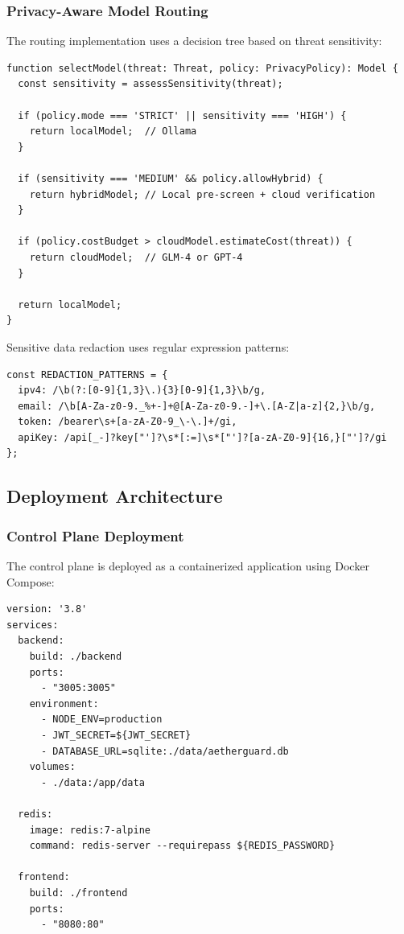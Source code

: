 \subsubsection{Privacy-Aware Model Routing}

The routing implementation uses a decision tree based on threat sensitivity:

\begin{verbatim}
function selectModel(threat: Threat, policy: PrivacyPolicy): Model {
  const sensitivity = assessSensitivity(threat);

  if (policy.mode === 'STRICT' || sensitivity === 'HIGH') {
    return localModel;  // Ollama
  }

  if (sensitivity === 'MEDIUM' && policy.allowHybrid) {
    return hybridModel; // Local pre-screen + cloud verification
  }

  if (policy.costBudget > cloudModel.estimateCost(threat)) {
    return cloudModel;  // GLM-4 or GPT-4
  }

  return localModel;
}
\end{verbatim}

Sensitive data redaction uses regular expression patterns:

\begin{verbatim}
const REDACTION_PATTERNS = {
  ipv4: /\b(?:[0-9]{1,3}\.){3}[0-9]{1,3}\b/g,
  email: /\b[A-Za-z0-9._%+-]+@[A-Za-z0-9.-]+\.[A-Z|a-z]{2,}\b/g,
  token: /bearer\s+[a-zA-Z0-9_\-\.]+/gi,
  apiKey: /api[_-]?key["']?\s*[:=]\s*["']?[a-zA-Z0-9]{16,}["']?/gi
};
\end{verbatim}

\subsection{Deployment Architecture}
\label{subsec:deployment}

\subsubsection{Control Plane Deployment}

The control plane is deployed as a containerized application using Docker Compose:

\begin{verbatim}
version: '3.8'
services:
  backend:
    build: ./backend
    ports:
      - "3005:3005"
    environment:
      - NODE_ENV=production
      - JWT_SECRET=${JWT_SECRET}
      - DATABASE_URL=sqlite:./data/aetherguard.db
    volumes:
      - ./data:/app/data

  redis:
    image: redis:7-alpine
    command: redis-server --requirepass ${REDIS_PASSWORD}

  frontend:
    build: ./frontend
    ports:
      - "8080:80"
\end{verbatim}

